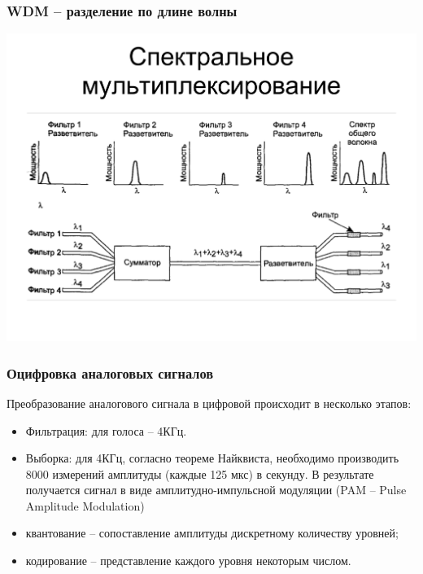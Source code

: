\documentclass[utf8]{beamer}
\begin{document}
\begin{frame}
\frametitle{WDM -- разделение по длине волны}
\begin{center}
\includegraphics[width=\textwidth]{pic/wdm.pdf}
\end{center}
\end{frame}
\begin{frame}
\frametitle{Оцифровка аналоговых сигналов}
Преобразование аналогового сигнала в цифровой происходит в несколько этапов:
 \begin{itemize}
	\item Фильтрация: для голоса – 4КГц.
	\item Выборка: для 4КГц, согласно теореме Найквиста, необходимо производить 8000 измерений амплитуды (каждые 125 мкс) в секунду. В результате получается сигнал в виде амплитудно-импульсной модуляции (PAM – Pulse Amplitude Modulation)
	\item квантование -- сопоставление амплитуды дискретному количеству уровней;
	\item кодирование -- представление каждого уровня некоторым числом.
\end{itemize}
\end{frame}
\end{document}
